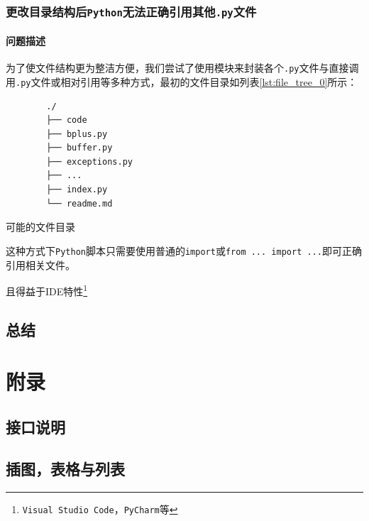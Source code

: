 \documentclass[UTF8]{ctexrep} %
\newenvironment{longlisting}{\captionsetup{type=listing}}{}
\begin{document}
\section{更改目录结构后\texttt{Python}无法正确引用其他\texttt{.py}文件}
\subsection{问题描述}
为了使文件结构更为整洁方便，我们尝试了使用模块来封装各个\texttt{.py}文件与直接调用\texttt{.py}文件或相对引用等多种方式，最初的文件目录如列表\ref{lst:file_tree_0}所示：
\begin{longlisting}
    \begin{verbatim}
        ./
        ├── code
        ├── bplus.py
        ├── buffer.py
        ├── exceptions.py
        ├── ...
        ├── index.py
        └── readme.md
    \end{verbatim}
    \label{lst:file_tree_0}
    \caption{可能的文件目录}
\end{longlisting}
这种方式下\texttt{Python}脚本只需要使用普通的\texttt{import}或\texttt{from ... import ...}即可正确引用相关文件。
\par
且得益于IDE特性\footnote{\texttt{Visual Studio Code}，\texttt{PyCharm}等}


\chapter{总结}

\newpage
\part{附录}


\begin{appendices}
\chapter{接口说明}

\chapter{插图，表格与列表}
\listoffigures
\listoftables
\listoflistings
\end{appendices}
\end{document}
